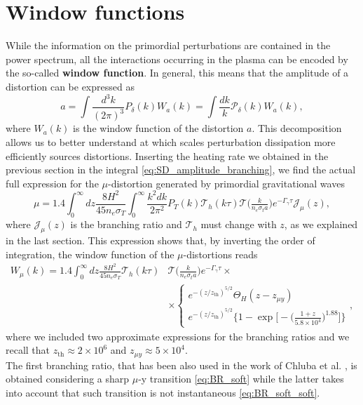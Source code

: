 \section{Window functions}
While the information on the primordial perturbations are contained in the power spectrum, all the interactions occurring in the plasma can be encoded by the so-called \textbf{window function}. In general, this means that the amplitude of a distortion can be expressed as
\begin{equation}\label{eq:window_function}
    a=\int\frac{d^3k}{(2\pi)^3} P_\delta(k) W_a(k)=\int\frac{dk}{k} \mathcal P_\delta(k) W_a(k) ,
\end{equation}
where $W_a(k)$ is the window function of the distortion $a$. This decomposition allows us to better understand at which scales perturbation dissipation more efficiently sources distortions. Inserting the heating rate we obtained in the previous section in the integral \eqref{eq:SD_amplitude_branching}, we find the actual full expression for the $\mu$-distortion generated by primordial gravitational waves
$$\mu=1.4\int_{0}^\infty dz\frac{8H^2}{45 n_e\sigma_T}\int_0^\infty\frac{k^2dk}{2\pi^2} P_T(k)\mathcal T_h(k\tau)\mathcal T\Big(\tfrac{k}{n_e\sigma_ta}\Big)e^{-\Gamma_\gamma\tau}\mathcal{J}_\mu(z),$$
where $\mathcal{J}_\mu(z)$ is the branching ratio and $\mathcal T_h$ must change with $z$, as we explained in the last section.
This expression shows that, by inverting the order of integration, the window function of the $\mu$-distortions reads
\begin{align*}
    W_\mu(k)=1.4\int_{0}^\infty dz\frac{8H^2}{45 n_e\sigma_T}\mathcal T_h(k\tau)&\mathcal T\Big(\tfrac{k}{n_e\sigma_ta}\Big)e^{-\Gamma_\gamma\tau}\times\\&\times
    \begin{cases}
        e^{-(z/z_{\text{th}})^{5/2}}\Theta_H(z-z_{\mu y})\\
        e^{-(z/z_{\text{th}})^{5/2}}\Bigg\{1-\exp\bigg[-\big(\frac{1+z}{5.8\times10^4}\big)^{1.88}\bigg]\Bigg\}
    \end{cases},
\end{align*}
where we included two approximate expressions for the branching ratios and we recall that $z_\text{th}\approx 2\times 10^6$ and $z_{\mu y}\approx 5\times 10^4$.\\
The first branching ratio, that has been also used in the work of Chluba et al. \cite{Chluba_tens_diss}, is obtained considering a sharp $\mu$-y transition \eqref{eq:BR_soft} while the latter takes into account that such transition is not instantaneous \eqref{eq:BR_soft_soft}.
